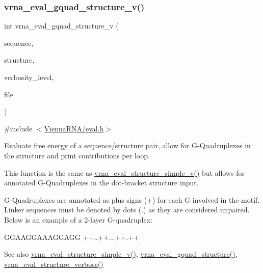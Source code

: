 \subsubsection{\texorpdfstring{vrna\+\_\+eval\+\_\+gquad\+\_\+structure\+\_\+v()}{vrna\_eval\_gquad\_structure\_v()}}
{\footnotesize\ttfamily int vrna\+\_\+eval\+\_\+gquad\+\_\+structure\+\_\+v (\begin{DoxyParamCaption}\item[{const char $\ast$}]{sequence,  }\item[{const char $\ast$}]{structure,  }\item[{int}]{verbosity\+\_\+level,  }\item[{F\+I\+LE $\ast$}]{file }\end{DoxyParamCaption})}



{\ttfamily \#include $<$\hyperlink{eval_8h}{Vienna\+R\+N\+A/eval.\+h}$>$}



Evaluate free energy of a sequence/structure pair, allow for G-\/\+Quadruplexes in the structure and print contributions per loop. 

This function is the same as \hyperlink{group__eval_gacd6278343e77d13f1d53588e50d303bc}{vrna\+\_\+eval\+\_\+structure\+\_\+simple\+\_\+v()} but allows for annotated G-\/\+Quadruplexes in the dot-\/bracket structure input.

G-\/\+Quadruplexes are annotated as plus signs (\textquotesingle{}+\textquotesingle{}) for each G involved in the motif. Linker sequences must be denoted by dots (\textquotesingle{}.\textquotesingle{}) as they are considered unpaired. Below is an example of a 2-\/layer G-\/quadruplex\+: 
\begin{DoxyCode}
GGAAGGAAAGGAGG
++..++...++.++
\end{DoxyCode}


\begin{DoxySeeAlso}{See also}
\hyperlink{group__eval_gacd6278343e77d13f1d53588e50d303bc}{vrna\+\_\+eval\+\_\+structure\+\_\+simple\+\_\+v()}, \hyperlink{group__eval_ga3263504825ef4b523eba797c99921df4}{vrna\+\_\+eval\+\_\+gquad\+\_\+structure()}, \hyperlink{group__eval_ga0928d699d310178f84ee2351034e5cb5}{vrna\+\_\+eval\+\_\+structure\+\_\+verbose()}
\end{DoxySeeAlso}

